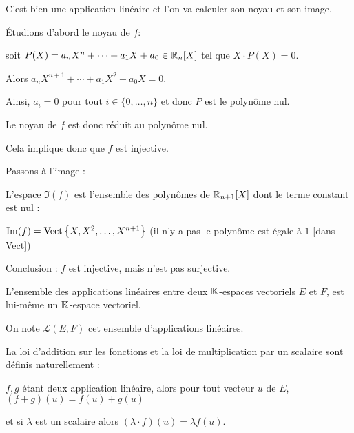 \change

C'est bien une application linéaire et l'on va calculer son noyau et son image.


\change

\'Etudions d'abord le noyau de $f$: 

\change

soit $P(X) = a_n X^n + \cdots +a_1 X + a_0 \in \mathbb{R}_n[X]$ 
tel que $X \cdot P(X) = 0$. 

\change

Alors $a_n X^{n+1} + \cdots+ a_1 X^2 + a_0 X = 0.$

\change

Ainsi, $a_i = 0$ pour tout $i \in \{0,\ldots, n\}$ et donc $P$ est le polynôme nul.

\change

Le noyau de $f$ est donc réduit au polynôme nul. 

\change

Cela implique donc que $f$ est injective.

\change

Passons à l'image :

\change

L'espace $\Im(f)$ est l'ensemble des polynômes de $\mathbb{R}_{n+1}[X]$ 
dont le terme constant est nul : 

\change

$\mathop{\text{Im}}\nolimits(f) = \mathop{\text{Vect}}\nolimits \big\{X, X^2,\dots, X^{n+1}\big\}$ (il n'y a pas le polynôme cst égale à $1$ [dans Vect])

\change

Conclusion : $f$ est injective, mais n'est pas surjective.



\diapo

L'ensemble des applications linéaires entre deux $\mathbb{K}$-espaces vectoriels $E$ et $F$,  est lui-même un $\mathbb{K}$-espace vectoriel.

On note $\mathcal{L}(E,F)$ cet ensemble d'applications linéaires.

\change

La loi d'addition sur les fonctions et la loi de multiplication par un scalaire sont définis
naturellement :

$f, g$ étant deux application linéaire, 
alors pour tout vecteur $u$ de $E$, $(f+g)(u)=f(u)+g(u)$

et si $\lambda$ est un scalaire alors 
$(\lambda \cdot f)(u)=\lambda f(u)$.


\diapo


